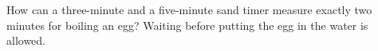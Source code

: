 How can a three-minute and a five-minute sand timer measure exactly two minutes for boiling an egg? Waiting before putting the egg in the water is allowed.
